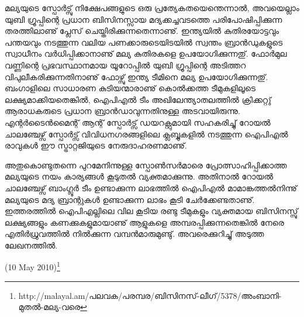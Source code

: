 മല്യയുടെ സ്പോര്‍ട്സു് നിക്ഷേപങ്ങളുടെ ഒരു പ്രത്യേകതയെന്തെന്നാല്‍, അവയെല്ലാം യുബി ഗ്രൂപ്പിന്റെ പ്രധാന ബിസിനസ്സായ 
മദ്യക്കച്ചവടത്തെ പരിപോഷിപ്പിക്കുന്ന തരത്തിലാണു് പ്ലേസ് ചെയ്തിരിക്കുന്നതെന്നാണു്. ഇന്ത്യയില്‍ കുതിരയോട്ടവും പന്തയവും 
നടത്തുന്ന വലിയ പണക്കാരുടെയിടയില്‍ സ്വന്തം ബ്രാന്‍ഡുകളുടെ സ്വാധീനം വര്‍ധിപ്പിക്കാനാണു് മല്യ കുതിരകളെ 
ഉപയോഗിക്കുന്നതു്. ഫോര്‍മുല വണ്ണിന്റെ പ്രഭവസ്ഥാനമായ യൂറോപ്പില്‍ യുബി ഗ്രൂപ്പിന്റെ അടിത്തറ വിപുലീകരിക്കുന്നതിനാണു് 
ഫോഴ്സു് ഇന്ത്യ ടീമിനെ മല്യ ഉപയോഗിക്കുന്നതു്. ബംഗാളിലെ സാധാരണ കുടിയന്മാരാണു് കൊല്‍ക്കത്ത ടീമുകളിലൂടെ 
ലക്ഷ്യമാക്കിയതെങ്കില്‍, ഐപിഎല്‍ ടീം അഖിലേന്ത്യാതലത്തില്‍ ക്രിക്കറ്റു് ആരാധകരുടെ പ്രധാന ബ്രാന്‍ഡാവുന്നതിനുള്ള 
അടവായിരുന്നു. എന്റര്‍ടൈന്‍മൈന്റ് ആന്റ് സ്പോര്‍ട്സ് ഡയറക്റ്റുമായി സഹകരിച്ചു് റോയല്‍ ചാലഞ്ചേഴ്സ് സ്പോര്‍ട്സ് 
വിവിധനഗരങ്ങളിലെ ക്ലബ്ബുകളില്‍ നടത്തുന്ന ഐപിഎല്‍ രാവുകള്‍ ഈ സ്ട്രാറ്റജിയുടെ നേരുദാഹരണമാണു്.

അതുകൊണ്ടുതന്നെ പുറമേനിന്നുള്ള സ്പോണ്‍സര്‍മാരെ പ്രോത്സാഹിപ്പിക്കാത്ത മല്യയുടെ നയം കാര്യങ്ങള്‍ കൂടുതല്‍ 
വ്യക്തമാക്കുന്നു. അതിനാല്‍ റോയല്‍ ചാലഞ്ചേഴ്സ് ബാംഗ്ലൂര്‍ ടീം ഉണ്ടാക്കുന്ന ലാഭത്തില്‍ ഐപിഎല്‍ മാമാങ്കത്തല്‍നിന്നു് 
മല്യയുടെ മദ്യ ബ്രാന്റുകള്‍ ഉണ്ടാക്കുന്ന ലാഭം കൂടി ചേര്‍ക്കേണ്ടതാണു്. ഇത്തരത്തില്‍ ഐപിഎല്ലിലെ വില കൂടിയ 
രണ്ടു ടീമുകളും വ്യക്തമായ ബിസിനസ്സു് ലക്ഷ്യങ്ങളും കണക്കുകളുമായാണു് ആളുകളെ അമ്പരപ്പിക്കുന്നതെങ്കില്‍ നേരെ 
എതിര്‍ധ്രുവത്തില്‍ നില്‍ക്കുന്ന വമ്പന്‍മാരുമുണ്ടു്. അവരെക്കുറിച്ചു് അടുത്ത ലേഖനത്തില്‍.

(10 May 2010)\footnote{http://malayal.am/പലവക/പരമ്പര/ബിസിനസ്-ലീഗ്/5378/അംബാനി-മുതല്‍-മല്യ-വരെ}

\newpage
